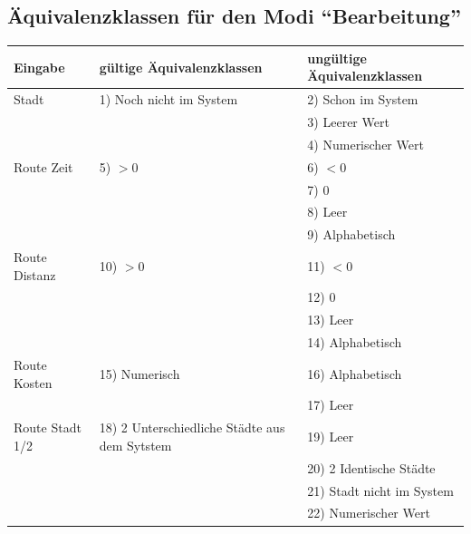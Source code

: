 \documentclass[a4paper]{report}
\begin{document}
\subsection*{Äquivalenzklassen für den Modi ``Bearbeitung''}
\begin{tabular}{|l|l|l|}
    Eingabe 	& gültige Äquivalenzklassen 	& ungültige Äquivalenzklassen\\
    \hline
Stadt 		& 1) Noch nicht im System 	& 2) Schon im System \\
		& 				& 3) Leerer Wert \\
		& 				& 4) Numerischer Wert \\
\hline
Route Zeit 	& 5) $>0$ 			& 6) $<0$\\
		&  				& 7) $0$\\
		&  				& 8) Leer \\
		& 				& 9) Alphabetisch \\
\hline
Route Distanz 	& 10) $>0$ 			& 11) $<0$\\
		&  				& 12) $0$\\
		&  				& 13) Leer \\
		& 				& 14) Alphabetisch \\
\hline
Route Kosten 	& 15) Numerisch 		& 16) Alphabetisch \\
		&  				& 17) Leer \\
\hline
Route Stadt 1/2 & 18) 2 Unterschiedliche Städte aus dem Sytstem & 19) Leer \\
		&  						& 20) 2 Identische Städte\\
		&  						& 21) Stadt nicht im System \\
		&  						& 22) Numerischer Wert \\ 
\hline
\end{tabular}
\end{document}
